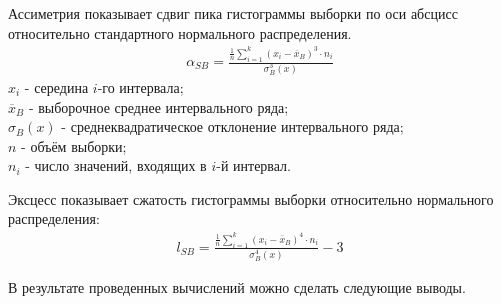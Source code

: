 \documentclass[utf8, a4paper, 14pt, russian, oneside]{book}
\begin{document}
\newpage


Ассиметрия показывает сдвиг пика гистограммы выборки по оси абсцисс относительно стандартного нормального распределения.
\begin{align*}
    \alpha_{SB} = \frac{
        \frac{1}{n} \sum_{i=1}^{k}(x_i - \overline{x}_B)^3 \cdot n_i
    }{\sigma_B^3(x)}    
\end{align*}
$x_i$ - середина $i$-го интервала;\\
$\overline{x}_B$ - выборочное среднее интервального ряда;\\
$\sigma_B(x)$ - среднеквадратическое отклонение интервального ряда;\\
$n$ - объём выборки;\\
$n_i$ - число значений, входящих в $i$-й интервал.

Эксцесс показывает сжатость гистограммы выборки относительно нормального распределения:
\begin{align*}
    l_{SB} = \frac{
        \frac{1}{n} \sum_{i=1}^{k}(x_i - \overline{x}_B)^4 \cdot n_i
    }{\sigma_B^4(x)}
    - 3
\end{align*}

\newpage

В результате проведенных вычислений можно сделать следующие выводы.
\end{document}
